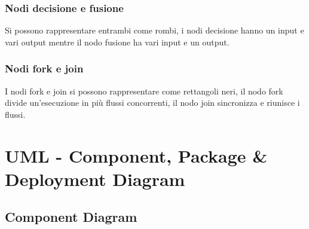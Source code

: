 \documentclass[12pt, a4paper]{report}
\begin{document}
\subsection{Nodi decisione e fusione}
Si possono rappresentare entrambi come rombi, i nodi decisione hanno un input e vari output mentre il nodo fusione ha vari input e un output.
\subsection{Nodi fork e join}
I nodi fork e join si possono rappresentare come rettangoli neri, il nodo fork divide un'esecuzione in più flussi concorrenti, il nodo join sincronizza e riunisce i flussi.
\chapter{UML - Component, Package \& Deployment Diagram}
\section{Component Diagram}
\end{document}
